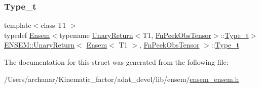 \subsubsection{\texorpdfstring{Type\_t}{Type\_t}\hspace{0.1cm}{\footnotesize\ttfamily [2/2]}}
{\footnotesize\ttfamily template$<$class T1 $>$ \\
typedef \mbox{\hyperlink{classENSEM_1_1Ensem}{Ensem}}$<$typename \mbox{\hyperlink{structENSEM_1_1UnaryReturn}{Unary\+Return}}$<$T1, \mbox{\hyperlink{structENSEM_1_1FnPeekObsTensor}{Fn\+Peek\+Obs\+Tensor}}$>$\+::\mbox{\hyperlink{structENSEM_1_1UnaryReturn_3_01Ensem_3_01T1_01_4_00_01FnPeekObsTensor_01_4_a6f60fb6656ccc4fbc31cc64aa1face1f}{Type\+\_\+t}}$>$ \mbox{\hyperlink{structENSEM_1_1UnaryReturn}{E\+N\+S\+E\+M\+::\+Unary\+Return}}$<$ \mbox{\hyperlink{classENSEM_1_1Ensem}{Ensem}}$<$ T1 $>$, \mbox{\hyperlink{structENSEM_1_1FnPeekObsTensor}{Fn\+Peek\+Obs\+Tensor}} $>$\+::\mbox{\hyperlink{structENSEM_1_1UnaryReturn_3_01Ensem_3_01T1_01_4_00_01FnPeekObsTensor_01_4_a6f60fb6656ccc4fbc31cc64aa1face1f}{Type\+\_\+t}}}



The documentation for this struct was generated from the following file\+:\begin{DoxyCompactItemize}
\item 
/\+Users/archanar/\+Kinematic\+\_\+factor/adat\+\_\+devel/lib/ensem/\mbox{\hyperlink{lib_2ensem_2ensem__ensem_8h}{ensem\+\_\+ensem.\+h}}\end{DoxyCompactItemize}
